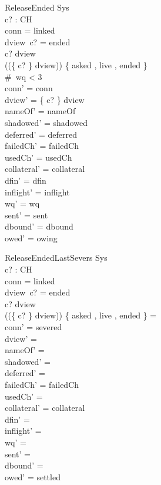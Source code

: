 \documentclass[a4paper,10pt,fleqn]{article}
\begin{document}
\begin{schema}{ReleaseEnded}
  \Delta Sys \\
  c? : CH \\
\where
  conn = linked \\
  dview~c? = ended \\
  c? \in \dom dview \\
  (\ran (\{ c? \} \ndres dview)) \cap \{ asked , live , ended \} \neq \emptyset \\
  \#~wq < 3 \\
  conn' = conn \\
  dview' = \{ c? \} \ndres dview \\
  nameOf' = nameOf \\
  shadowed' = shadowed \\
  deferred' = deferred \\
  failedCh' = failedCh \\
  usedCh' = usedCh \\
  collateral' = collateral \\
  dfin' = dfin \\
  inflight' = inflight \\
  wq' = wq \\
  sent' = sent \\
  dbound' = dbound \\
  owed' = owing
\end{schema}

\begin{schema}{ReleaseEndedLastSevers}
  \Delta Sys \\
  c? : CH \\
\where
  conn = linked \\
  dview~c? = ended \\
  c? \in \dom dview \\
  (\ran (\{ c? \} \ndres dview)) \cap \{ asked , live , ended \} = \emptyset \\
  conn' = severed \\
  dview' = \emptyset \\
  nameOf' = \emptyset \\
  shadowed' = \emptyset \\
  deferred' = \emptyset \\
  failedCh' = failedCh \\
  usedCh' = \emptyset \\
  collateral' = collateral \\
  dfin' = \emptyset \\
  inflight' = \langle \rangle \\
  wq' = \langle \rangle \\
  sent' = \langle \rangle \\
  dbound' = \emptyset \\
  owed' = settled
\end{schema}
\end{document}

